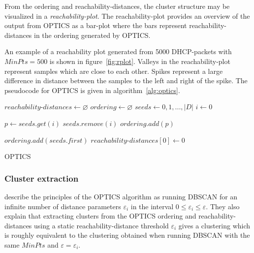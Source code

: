 \documentclass[a4paper]{report}
\begin{document}
From the ordering and reachability-distances, the cluster structure may be
visualized in a \emph{reachability-plot}. The reachability-plot provides an
overview of the output from OPTICS as a bar-plot where the bars represent
reachability-distances in the ordering generated by OPTICS.

An example of a reachability plot generated from 5000 DHCP-packets with
$MinPts = 500$ is shown in figure~\ref{fig:rplot}. Valleys in the
reachability-plot represent samples which are close to each other. Spikes
represent a large difference in distance between the samples to the left and
right of the spike. The pseudocode for OPTICS is given in
algorithm~\ref{alg:optics}.
\\
{
    \fontsize{10}{12}
    \selectfont
    \begin{algorithm}[H]
        \DontPrintSemicolon
        \BlankLine
        \BlankLine

        $reachability$-$distances \gets \varnothing$\;
        $ordering \gets \varnothing$\;
        $seeds \gets 0,1,...,|D|$\;
        $i \gets 0$\;

         {
            $p \gets seeds.get(i)$\;
            $seeds.remove(i)$\;
            $ordering.add(p)$\;

        }
        \;
        $ordering.add(seeds.first)$\;
        $reachability$-$distances[0] \gets 0$\;
        \BlankLine
        \caption{OPTICS}
        \label{alg:optics}
    \end{algorithm}
}

\subsubsection{Cluster extraction}

\citeauthor{ankerst99} describe the principles of the OPTICS algorithm as
running DBSCAN for an infinite number of distance parameters $\varepsilon_i$
in the interval $0 \le \varepsilon_i \le \varepsilon$. They also explain that
extracting clusters from the OPTICS ordering and reachability-distances using
a static reachability-distance threshold $\varepsilon_i$ gives a clustering
which is roughly equivalent to the clustering obtained when running DBSCAN
with the same $MinPts$ and $\varepsilon = \varepsilon_i$.
\end{document}
